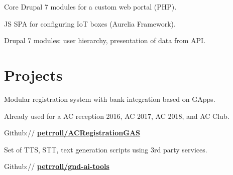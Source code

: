 \documentclass[a4paper]{deedy-resume} %
\begin{document}
\begin{minipage}[t]{0.62\textwidth}
\sectionspace %



\begin{tightitemize}
\item Core Drupal 7 modules for a custom web portal (PHP).
\item JS SPA for configuring IoT boxes (Aurelia Framework).
\end{tightitemize}

\begin{tightitemize}
\item Drupal 7 modules: user hierarchy, presentation of data from API.
\end{tightitemize}

\sectionspace %

\section{Projects}


\emptyLocation %
\begin{tightitemize}
\item Modular registration system with bank integration based on GApps.
\item Already used for a AC reception 2016, AC 2017, AC 2018, and AC Club.
\item Github:// \href{https://github.com/petrroll/ACRegistrationGAS}{\bf petrroll/ACRegistrationGAS}
\end{tightitemize}

\sectionspace %


\emptyLocation %
\begin{tightitemize}
\item Set of TTS, STT, text generation scripts using 3rd party services.
\item Github:// \href{https://github.com/petrroll/gnd-ai-tools}{\bf petrroll/gnd-ai-tools}
\end{tightitemize}


\end{minipage}
\end{document}
